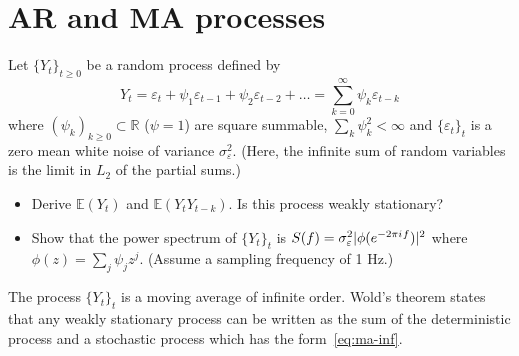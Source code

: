 \documentclass[11pt]{article}
\begin{document}
\newpage
\section{AR and MA processes}

\begin{exercise}[subtitle=Infinite order moving average MA($\infty$)]
Let $\{Y_t\}_{t\geq 0}$ be a random process defined by
\begin{equation}\label{eq:ma-inf}
    Y_t = \varepsilon_t + \psi_1 \varepsilon_{t-1} + \psi_2 \varepsilon_{t-2} + \dots = \sum_{k=0}^{\infty} \psi_k\varepsilon_{t-k}
\end{equation}
where $(\psi_k)_{k\geq0} \subset \mathbb{R}$ ($\psi=1$) are square summable, \ie $\sum_k \psi_k^2 < \infty$ and $\{\varepsilon_t\}_t$ is a zero mean white noise of variance $\sigma_\varepsilon^2$.
(Here, the infinite sum of random variables is the limit in $L_2$ of the partial sums.)
\begin{itemize}
    \item Derive $\mathbb{E}(Y_t)$ and $\mathbb{E}(Y_t Y_{t-k})$. Is this process weakly stationary?
    \item Show that the power spectrum of $\{Y_t\}_{t}$ is $S(f) = \sigma_\varepsilon^2 |\phi(e^{-2\pi{i\mkern1mu} f})|^2$ where $\phi(z) = \sum_j \psi_j z^j$. (Assume a sampling frequency of 1 Hz.)
\end{itemize}

The process $\{Y_t\}_{t}$ is a moving average of infinite order.
Wold's theorem states that any weakly stationary process can be written as the sum of the deterministic process and a stochastic process which has the form~\eqref{eq:ma-inf}.

\end{exercise}
\end{document}
